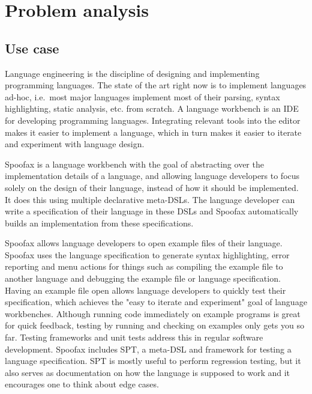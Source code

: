 
\section{Problem analysis}
\label{sec:problem_analysis}

\subsection{Use case}
\label{subsec:problem_analysis__use_case}

Language engineering is the discipline of designing and implementing programming languages.
The state of the art right now is to implement languages ad-hoc, i.e.\ most major languages implement most of their parsing, syntax highlighting, static analysis, etc. from scratch.\missingref
A language workbench is an \ac{IDE} for developing programming languages.
Integrating relevant tools into the editor makes it easier to implement a language, which in turn makes it easier to iterate and experiment with language design.

Spoofax is a language workbench with the goal of abstracting over the implementation details of a language, and allowing language developers to focus solely on the design of their language, instead of how it should be implemented.
It does this using multiple declarative meta-\acp{DSL}.
The language developer can write a specification of their language in these \acp{DSL} and Spoofax automatically builds an implementation from these specifications.

Spoofax allows language developers to open example files of their language.
Spoofax uses the language specification to generate syntax highlighting, error reporting and menu actions for things such as compiling the example file to another language and debugging the example file or language specification.
Having an example file open allows language developers to quickly test their specification, which achieves the "easy to iterate and experiment" goal of language workbenches.
Although running code immediately on example programs is great for quick feedback, testing by running and checking on examples only gets you so far.
Testing frameworks and unit tests address this in regular software development.
Spoofax includes SPT, a meta-\ac{DSL} and framework for testing a language specification.
SPT is mostly useful to perform regression testing, but it also serves as documentation on how the language is supposed to work and it encourages one to think about edge cases.

